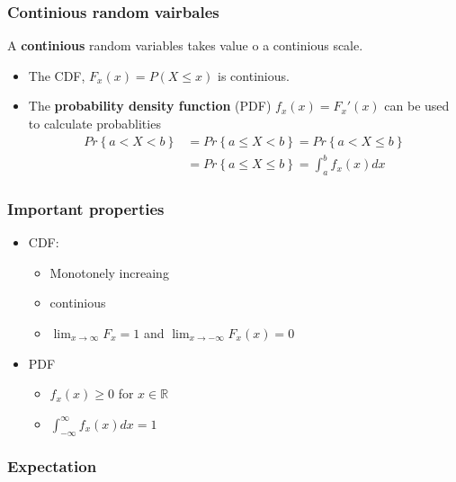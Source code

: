 \documentclass{article}
\theoremstyle{remark}
\begin{document}
\subsubsection{Continious random vairbales}%
\label{ssub:continious_random_vairbales}
 A \textbf{continious} random variables takes value o a continious scale.
 \begin{itemize}
   \item The CDF, $F_{x}\left( x \right) = P \left( X \le x \right)$ is continious.
   \item The \textbf{probability density function} (PDF) $f_{x}\left( x \right) = F_{x}' \left( x \right)$ can be used to calculate probablities \[
   \begin{split}
     Pr \left\{ a < X < b \right\} &=  Pr \left\{ a \le X < b \right\} = Pr\left\{ a < X \le b \right\} \\
     &=  Pr\left\{ a \le X \le b \right\} = \int_{a}^{b}  f_{x}\left( x \right)dx   
   \end{split} 
   \] 
 \end{itemize}


 \subsubsection{Important properties}%
 \label{ssub:important_properties}

 \begin{itemize}
   \item CDF:
     \begin{itemize}
       \item Monotonely increaing
       \item continious
        \item $\lim_{x \to \infty} F_{x} = 1$ and $\lim_{x \to - \infty} F_{x}\left( x \right) = 0$
     \end{itemize}
   \item PDF
     \begin{itemize}
       \item $f_{x}\left( x \right) \ge 0$ for $x \in\mathbb{R} $
       \item $\int_{-\infty}^{\infty} f_{x}\left( x \right)dx = 1$
     \end{itemize}
 \end{itemize}


\subsubsection{Expectation}%
\label{ssub:expectation}
\end{document}
